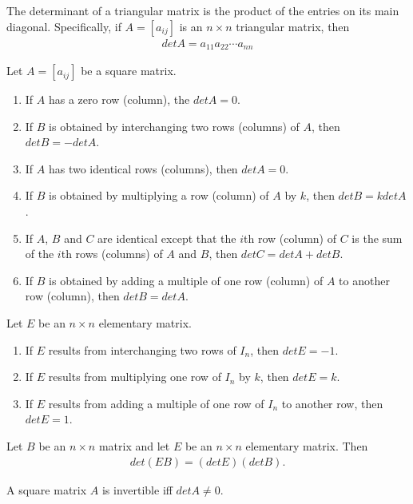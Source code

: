 \documentclass{article}
\begin{document}
\begin{theorem}
	The determinant of a triangular matrix is the product of the entries on its main diagonal.
	Specifically, if $A=[a_{ij}]$ is an $n\times n$ triangular matrix, then
	\begin{align*}
		det A = a_{11}a_{22}\cdots a_{nn}
	\end{align*}
\end{theorem}
\begin{theorem}
	Let $A=[a_{ij}]$ be a square matrix.
	\begin{enumerate}
		\item If $A$ has a zero row (column), the $det A = 0$.
		\item If $B$ is obtained by interchanging two rows (columns) of $A$, then $det B = -det A$.
		\item If $A$ has two identical rows (columns), then $det A = 0$.
		\item If $B$ is obtained by multiplying a row (column) of $A$ by $k$, then $det B = k det A$.
		\item If $A$, $B$ and $C$ are identical except that the $i$th row (column) of $C$ is the sum of the $i$th rows (columns) of $A$ and $B$, then $det C = det A + det B$.
		\item If $B$ is obtained by adding a multiple of one row (column) of $A$ to another row (column), then $det B = det A$.
	\end{enumerate}
\end{theorem}
\begin{theorem}
	Let $E$ be an $n\times n$ elementary matrix.
	\begin{enumerate}
		\item If $E$ results from interchanging two rows of $I_n$, then $det E = -1$.
		\item If $E$ results from multiplying one row of $I_n$ by $k$, then $det E = k$.
		\item If $E$ results from adding a multiple of one row of $I_n$ to another row, then $det E = 1$.
	\end{enumerate}
\end{theorem}
\begin{theorem}
	Let $B$ be an $n\times n$ matrix and let $E$ be an $n\times n$ elementary matrix. Then
	\begin{align*}
		det(EB) = (det E)(det B).
	\end{align*}
\end{theorem}
\begin{theorem}
	A square matrix $A$ is invertible iff $det A \not= 0$.
\end{theorem}
\end{document}
